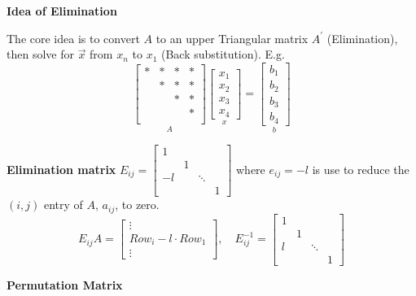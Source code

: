 \documentclass[13pt]{article}
\theoremstyle{definition}
\theoremstyle{remark}
\begin{document}
\begin{multicols}{2}
\begin{itemize}
\end{itemize}

\textbf{Idea of Elimination}

 The core idea is to convert $A$ to an upper Triangular matrix $A^{\prime}$ (Elimination), then solve for $\vec{x}$ from $x_n$ to $x_1$ (Back substitution). E.g.
\[
\underset{A}{\begin{bmatrix}
     * & * & * & *\\
      & * & * & *\\
      &  & * & *\\
      &  &  & *\\
\end{bmatrix}} \underset{x}{\begin{bmatrix}
     x_1 \\
     x_2 \\
     x_3 \\
     x_4 
\end{bmatrix}} = \underset{b}{\begin{bmatrix}
     b_1 \\
     b_2 \\
     b_3 \\
     b_4 
\end{bmatrix}}
\]

\textbf{Elimination matrix} 
$E_{ij}=\begin{bmatrix}
1 &  & & \\
 & 1 & & \\
-l &  & \ddots &\\
 & & & 1
\end{bmatrix}$ where $e_{ij} = -l$ is use to reduce the $(i, j)$ entry of $A$, $a_{ij}$, to zero.
$$E_{ij} A=\begin{bmatrix}
\vdots \\
Row_i-l \cdot Row_1\\
\vdots
\end{bmatrix}, \quad E_{ij}^{-1} = \begin{bmatrix}
1 &  & & \\
 & 1 & & \\
l &  & \ddots &\\
 & & & 1
\end{bmatrix}
$$

\textbf{Permutation Matrix}


\end{multicols}
\end{document}
